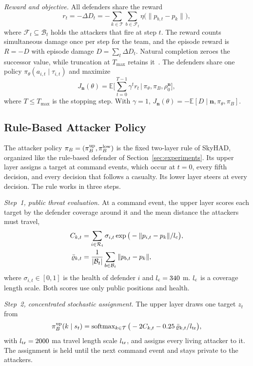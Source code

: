 \emph{Reward and objective.} All defenders share the reward
\begin{equation}
r_t=-\Delta D_t=-\sum_{k\in\mathcal T}\sum_{b\in\mathcal F_t}\eta\big(\|p_{b,t}-p_k\|\big),
\label{eq:fw-reward}
\end{equation}
where $\mathcal F_t\subseteq\mathcal B_t$ holds the attackers that fire at step $t$. The reward counts simultaneous damage once per step for the team, and the episode reward is $R=-D$ with episode damage $D=\sum_t\Delta D_t$. Natural completion zeroes the successor value, while truncation at $T_{\max}$ retains it~\cite{pardo2018timelimits}. The defenders share one policy $\pi_\theta(a_{i,t}\mid\tau_{i,t})$ and maximize
\begin{equation}
J_{\mathbf n}(\theta)=\mathbb E\Big[\sum_{t=0}^{T-1}\gamma^tr_t\,\Big|\,\pi_\theta,\pi_B,\rho_0^{\mathbf n}\Big],
\label{eq:fw-objective}
\end{equation}
where $T\le T_{\max}$ is the stopping step. With $\gamma=1$, $J_{\mathbf n}(\theta)=-\mathbb E[D\mid\mathbf n,\pi_\theta,\pi_B]$.

\subsection{Rule-Based Attacker Policy}
\label{subsec:pf-attacker}

The attacker policy $\pi_B=(\pi_B^{\rm up},\pi_B^{\rm low})$ is the fixed two-layer rule of SkyHAD, organized like the rule-based defender of Section~\ref{sec:experiments}. Its upper layer assigns a target at command events, which occur at $t=0$, every fifth decision, and every decision that follows a casualty. Its lower layer steers at every decision. The rule works in three steps.

\emph{Step~1, public threat evaluation.} At a command event, the upper layer scores each target by the defender coverage around it and the mean distance the attackers must travel,
\begin{align}
C_{k,t}&=\sum_{i\in\mathcal R_t}\sigma_{i,t}\exp\big(-\|p_{i,t}-p_k\|/l_{\rm c}\big),\nonumber\\
\bar\varrho_{k,t}&=\frac{1}{|\mathcal B_t|}\sum_{b\in\mathcal B_t}\|p_{b,t}-p_k\|,
\label{eq:fw-coverage}
\end{align}
where $\sigma_{i,t}\in[0,1]$ is the health of defender $i$ and
\ifvehicledetail
$l_{\rm c}=340$ m.
\else
$l_{\rm c}$ is a coverage length scale.
\fi
Both scores use only public positions and health.

\emph{Step~2, concentrated stochastic assignment.} The upper layer draws one target $z_t$ from
\begin{equation}
\pi_B^{\rm up}(k\mid s_t)=\operatorname{softmax}_{k\in\mathcal T}\big(-2C_{k,t}-0.25\,\bar\varrho_{k,t}/l_{\rm tr}\big),
\label{eq:fw-assignment}
\end{equation}
with \ifvehicledetail $l_{\rm tr}=2000$ m\else a travel length scale $l_{\rm tr}$\fi, and assigns every living attacker to it. The assignment is held until the next command event and stays private to the attackers.

